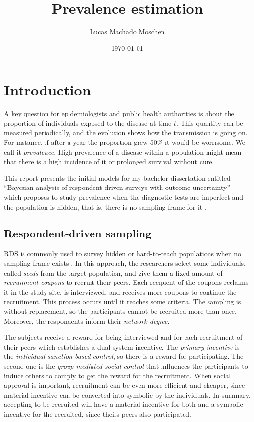 \documentclass[a4paper, notitlepage, 11pt]{article}
\title{Prevalence estimation}
\author{Lucas Machado Moschen}
\affil{School of Applied Mathematics, \\ Fundação Getulio Vargas}
\date{\today}
\theoremstyle{definition}
\theoremstyle{remark}
\begin{document}
\maketitle

\section{Introduction}

A key question for epidemiologists and public health authorities is about the
proportion of individuals exposed to the disease at time $t$. This quantity
can be measured periodically, and the evolution shows how the transmission is
going on. For instance, if after a year the proportion grew 50\% it would be
worrisome. We call it {\em prevalence}. High prevalence of a disease within a
population might mean that there is a high incidence of it or prolonged
survival without cure. 

This report presents the initial models for my bachelor dissertation entitled ``Bayesian analysis of respondent-driven surveys with
outcome uncertainty'', which proposes to study prevalence when the diagnostic
tests are imperfect and the population is hidden, that is, there is no
sampling frame for it \cite{heckathorn1997}. 

\subsection{Respondent-driven sampling}

RDS is commonly used to survey hidden or hard-to-reach populations when
no sampling frame exists \cite{heckathorn1997}. In this approach, the
researchers select some individuals, called {\em seeds} from the target
population, and give them a fixed amount of {\em recruitment coupons} to
recruit their peers. Each recipient of the coupons reclaims it in the study
site, is interviewed, and receives more coupons to continue the recruitment.
This process occurs until it reaches some criteria. The sampling is without
replacement, so the participants cannot be recruited more than once. Moreover,
the respondents inform their {\em network degree}.

The subjects receive a reward for being interviewed and for each recruitment
of their peers which establishes a dual system incentive. The {\em primary incentive} is the
{\em individual-sanction-based control}, so there is a reward for
participating. The second one is the {\em group-mediated social control} that
influences the participants to induce others to comply to get the reward for the recruitment. When social approval is important, recruitment can be even
more efficient and cheaper, since material incentive can be converted into
symbolic by the individuals. In summary, accepting to be recruited will have a
material incentive for both and a symbolic incentive for the recruited, since
theirs peers also participated.
\end{document}
